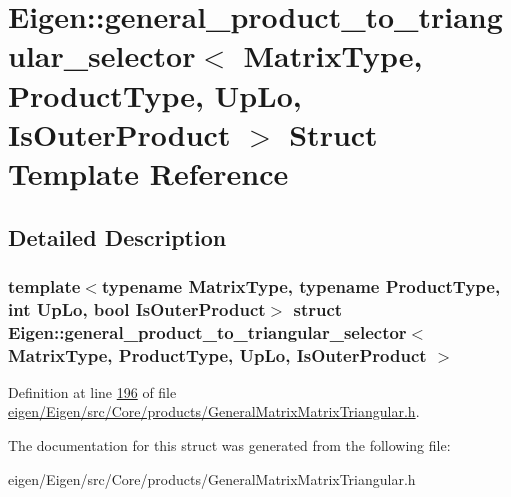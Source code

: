 \hypertarget{struct_eigen_1_1general__product__to__triangular__selector}{}\section{Eigen\+:\+:general\+\_\+product\+\_\+to\+\_\+triangular\+\_\+selector$<$ Matrix\+Type, Product\+Type, Up\+Lo, Is\+Outer\+Product $>$ Struct Template Reference}
\label{struct_eigen_1_1general__product__to__triangular__selector}


\subsection{Detailed Description}
\subsubsection*{template$<$typename Matrix\+Type, typename Product\+Type, int Up\+Lo, bool Is\+Outer\+Product$>$\newline
struct Eigen\+::general\+\_\+product\+\_\+to\+\_\+triangular\+\_\+selector$<$ Matrix\+Type, Product\+Type, Up\+Lo, Is\+Outer\+Product $>$}



Definition at line \hyperlink{eigen_2_eigen_2src_2_core_2products_2_general_matrix_matrix_triangular_8h_source_l00196}{196} of file \hyperlink{eigen_2_eigen_2src_2_core_2products_2_general_matrix_matrix_triangular_8h_source}{eigen/\+Eigen/src/\+Core/products/\+General\+Matrix\+Matrix\+Triangular.\+h}.



The documentation for this struct was generated from the following file\+:\begin{DoxyCompactItemize}
\item 
eigen/\+Eigen/src/\+Core/products/\+General\+Matrix\+Matrix\+Triangular.\+h\end{DoxyCompactItemize}
